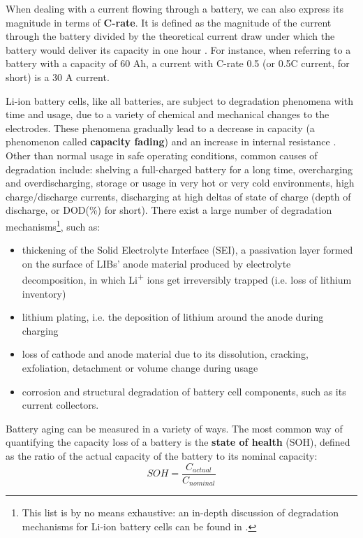 When dealing with a current flowing through a battery, we can also express its magnitude in terms of \textbf{C-rate}. It is defined as the magnitude of the current through the battery divided by the theoretical current draw under which the battery would deliver its capacity in one hour \cite{c-rate}. For instance, when referring to a battery with a capacity of 60 Ah, a current with C-rate 0.5 (or 0.5C current, for short) is a 30 A current.

Li-ion battery cells, like all batteries, are subject to degradation phenomena with time and usage, due to a variety of chemical and mechanical changes to the electrodes. These phenomena gradually lead to a decrease in capacity (a phenomenon called \textbf{capacity fading}) and an increase in internal resistance \cite{capacity_fading}. Other than normal usage in safe operating conditions, common causes of degradation include: shelving a full-charged battery for a long time, overcharging and overdischarging, storage or usage in very hot or very cold environments, high charge/discharge currents, discharging at high deltas of state of charge (depth of discharge, or DOD(\%) for short). There exist a large number of degradation mechanisms\footnote{This list is by no means exhaustive: an in-depth discussion of degradation mechanisms for Li-ion battery cells can be found in \cite{capacity_fading}.}, such as:
\begin{itemize}
    \item thickening of the Solid Electrolyte Interface (SEI), a passivation layer formed on the surface of LIBs' anode material produced by electrolyte decomposition, in which Li\textsuperscript{+} ions get irreversibly trapped (i.e. loss of lithium inventory)
    \item lithium plating, i.e. the deposition of lithium around the anode during charging
    \item loss of cathode and anode material due to its dissolution, cracking, exfoliation, detachment or volume change during usage
    \item corrosion and structural degradation of battery cell components, such as its current collectors.
\end{itemize}

Battery aging can be measured in a variety of ways. The most common way of quantifying the capacity loss of a battery is the \textbf{state of health} (SOH), defined as the ratio of the actual capacity of the battery to its nominal capacity:
\begin{equation}
\label{eq:soh}
SOH = \frac{C_{actual}}{C_{nominal}}
\end{equation}

